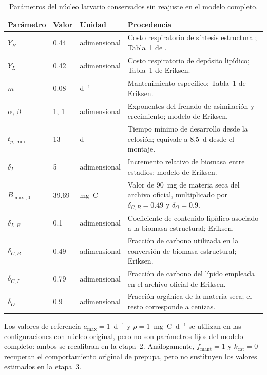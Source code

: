 \begin{table}[htbp]
  \centering
  \small
  \caption{Parámetros del núcleo larvario conservados sin reajuste en el
  modelo completo.}
  \label{tab:s5-eriksen}
  \begin{tabular}{llp{1.8cm}p{6.8cm}}
    \toprule
    Parámetro & Valor & Unidad & Procedencia \\
    \midrule
    $Y_B$ & 0.44 & adimensional & Costo respiratorio de síntesis estructural;
    Tabla~1 de \textcite{eriksenDynamicModellingFeed2022}. \\
    $Y_L$ & 0.42 & adimensional & Costo respiratorio de depósito lipídico;
    Tabla~1 de Eriksen. \\
    $m$ & 0.08 & d$^{-1}$ & Mantenimiento específico; Tabla~1 de Eriksen. \\
    $\alpha$, $\beta$ & 1, 1 & adimensional & Exponentes del frenado de
    asimilación y crecimiento; modelo de Eriksen. \\
    $t_{p,\min}$ & 13 & d & Tiempo mínimo de desarrollo desde la eclosión;
    equivale a 8.5~d desde el montaje. \\
    $\delta_I$ & 5 & adimensional & Incremento relativo de biomasa entre
    estadios; modelo de Eriksen. \\
    $B_{\max,0}$ & 39.69 & mg~C & Valor de 90~mg de materia seca del archivo
    oficial, multiplicado por $\delta_{C,B}=0.49$ y $\delta_O=0.9$. \\
    $\delta_{L,B}$ & 0.1 & adimensional & Coeficiente de contenido lipídico
    asociado a la biomasa estructural; Eriksen. \\
    $\delta_{C,B}$ & 0.49 & adimensional & Fracción de carbono utilizada en
    la conversión de biomasa estructural; Eriksen. \\
    $\delta_{C,L}$ & 0.79 & adimensional & Fracción de carbono del lípido
    empleada en el archivo oficial de Eriksen. \\
    $\delta_O$ & 0.9 & adimensional & Fracción orgánica de la materia seca;
    el resto corresponde a cenizas. \\
    \bottomrule
  \end{tabular}
\end{table}

Los valores de referencia $a_{\max}=1$~d$^{-1}$ y
$\rho=1$~mg~C~d$^{-1}$ se utilizan en las configuraciones con núcleo original,
pero no son parámetros fijos del modelo completo: ambos se recalibran en la
etapa~2. Análogamente, $f_{\mathrm{mant}}=1$ y $k_{\mathrm{cat}}=0$ recuperan
el comportamiento original de prepupa, pero no sustituyen los valores
estimados en la etapa~3.

